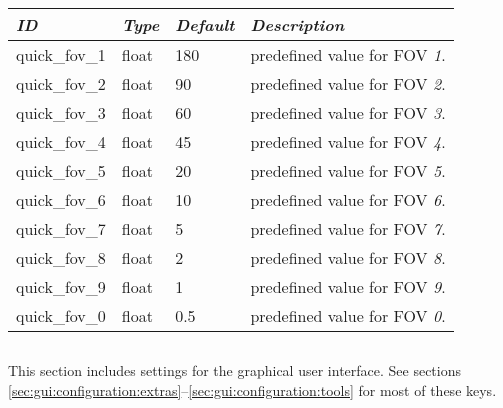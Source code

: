 \noindent%
\begin{tabularx}{\textwidth}{l|l|l|X}\toprule
\emph{ID} & \emph{Type} & \emph{Default} & \emph{Description}\\\midrule
quick\_fov\_1 & float & 180  & predefined value for FOV \emph{1}.\\
quick\_fov\_2 & float & 90   & predefined value for FOV \emph{2}.\\
quick\_fov\_3 & float & 60   & predefined value for FOV \emph{3}.\\
quick\_fov\_4 & float & 45   & predefined value for FOV \emph{4}.\\
quick\_fov\_5 & float & 20   & predefined value for FOV \emph{5}.\\
quick\_fov\_6 & float & 10   & predefined value for FOV \emph{6}.\\
quick\_fov\_7 & float & 5    & predefined value for FOV \emph{7}.\\
quick\_fov\_8 & float & 2    & predefined value for FOV \emph{8}.\\
quick\_fov\_9 & float & 1    & predefined value for FOV \emph{9}.\\
quick\_fov\_0 & float & 0.5  & predefined value for FOV \emph{0}.\\\bottomrule
\end{tabularx}


\subsection{}

This section includes settings for the graphical user interface. See sections \ref{sec:gui:configuration:extras}--\ref{sec:gui:configuration:tools} for most of these keys.

